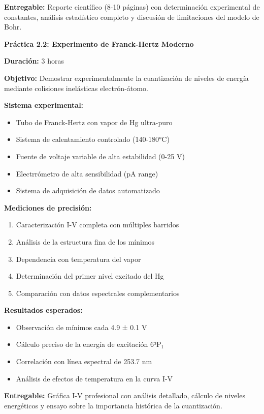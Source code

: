\begin{tecnologiabox}
\begin{tecnologiabox}
\begin{tecnologiabox}
\begin{teknologiabox}
\begin{practicabox}
\textbf{Entregable:} Reporte científico (8-10 páginas) con determinación experimental de constantes, análisis estadístico completo y discusión de limitaciones del modelo de Bohr.
\end{practicabox}

\begin{practicabox}
\textbf{Práctica 2.2: Experimento de Franck-Hertz Moderno}

\textbf{Duración:} 3 horas

\textbf{Objetivo:} Demostrar experimentalmente la cuantización de niveles de energía mediante colisiones inelásticas electrón-átomo.

\textbf{Sistema experimental:}
\begin{itemize}
\item Tubo de Franck-Hertz con vapor de Hg ultra-puro
\item Sistema de calentamiento controlado (140-180°C)
\item Fuente de voltaje variable de alta estabilidad (0-25 V)
\item Electrrómetro de alta sensibilidad (pA range)
\item Sistema de adquisición de datos automatizado
\end{itemize}

\textbf{Mediciones de precisión:}
\begin{enumerate}
\item Caracterización I-V completa con múltiples barridos
\item Análisis de la estructura fina de los mínimos
\item Dependencia con temperatura del vapor
\item Determinación del primer nivel excitado del Hg
\item Comparación con datos espectrales complementarios
\end{enumerate}

\textbf{Resultados esperados:}
\begin{itemize}
\item Observación de mínimos cada 4.9 ± 0.1 V
\item Cálculo preciso de la energía de excitación 6³P₁
\item Correlación con línea espectral de 253.7 nm
\item Análisis de efectos de temperatura en la curva I-V
\end{itemize}

\textbf{Entregable:} Gráfica I-V profesional con análisis detallado, cálculo de niveles energéticos y ensayo sobre la importancia histórica de la cuantización.
\end{practicabox}


\end{teknologiabox}
\end{tecnologiabox}
\end{tecnologiabox}
\end{tecnologiabox}
